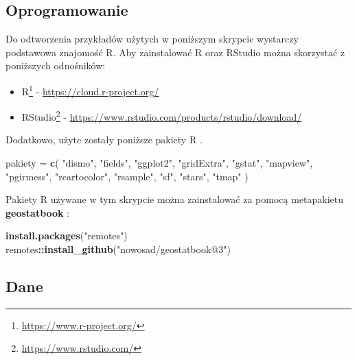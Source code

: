 \documentclass[
  paper=6in:9in,pagesize=pdftex,headinclude=on,footinclude=on,10pt]{scrbook}
\newenvironment{Shaded}{\begin{snugshade}}{\end{snugshade}}
\newcommand{\FunctionTok}[1]{\textcolor[rgb]{0.13,0.29,0.53}{\textbf{#1}}}
\newcommand{\NormalTok}[1]{#1}
\newcommand{\OtherTok}[1]{\textcolor[rgb]{0.56,0.35,0.01}{#1}}
\newcommand{\SpecialCharTok}[1]{\textcolor[rgb]{0.81,0.36,0.00}{\textbf{#1}}}
\newcommand{\StringTok}[1]{\textcolor[rgb]{0.31,0.60,0.02}{#1}}
\providecommand{\tightlist}{%
  \setlength{\itemsep}{0pt}\setlength{\parskip}{0pt}}
\renewcommand{\href}[2]{#2 (\url{#1})}
\renewcommand{\href}[2]{#2\footnote{\url{#1}}}
\begin{document}
\subsection*{Oprogramowanie}\label{oprogramowanie}


Do odtworzenia przykładów użytych w poniższym skrypcie wystarczy podstawowa znajomość R.
Aby zainstalować R oraz RStudio można skorzystać z poniższych odnośników:

\begin{itemize}
\tightlist
\item
  \href{https://www.r-project.org/}{R} - \url{https://cloud.r-project.org/}
\item
  \href{https://www.rstudio.com/}{RStudio} - \url{https://www.rstudio.com/products/rstudio/download/}
\end{itemize}

Dodatkowo, użyte zostały poniższe pakiety R \citep{R-dismo, R-fields, R-ggplot2, R-gridExtra, R-gstat, R-mapview, R-pgirmess, R-rcartocolor, R-rsample, R-sf, R-stars}.

\begin{Shaded}
\begin{Highlighting}[]
\NormalTok{pakiety }\OtherTok{=} \FunctionTok{c}\NormalTok{(}
  \StringTok{"dismo"}\NormalTok{, }\StringTok{"fields"}\NormalTok{, }\StringTok{"ggplot2"}\NormalTok{, }\StringTok{"gridExtra"}\NormalTok{, }\StringTok{"gstat"}\NormalTok{, }\StringTok{"mapview"}\NormalTok{, }
  \StringTok{"pgirmess"}\NormalTok{, }\StringTok{"rcartocolor"}\NormalTok{, }\StringTok{"rsample"}\NormalTok{, }\StringTok{"sf"}\NormalTok{, }\StringTok{"stars"}\NormalTok{, }\StringTok{"tmap"}
\NormalTok{)}
\end{Highlighting}
\end{Shaded}

Pakiety R używane w tym skrypcie można zainstalować za pomocą metapakietu \textbf{geostatbook} \citep{R-geostatbook}:

\begin{Shaded}
\begin{Highlighting}[]
\FunctionTok{install.packages}\NormalTok{(}\StringTok{"remotes"}\NormalTok{)}
\NormalTok{remotes}\SpecialCharTok{::}\FunctionTok{install\_github}\NormalTok{(}\StringTok{"nowosad/geostatbook@3"}\NormalTok{)}
\end{Highlighting}
\end{Shaded}

\subsection*{Dane}\label{dane}
\end{document}
